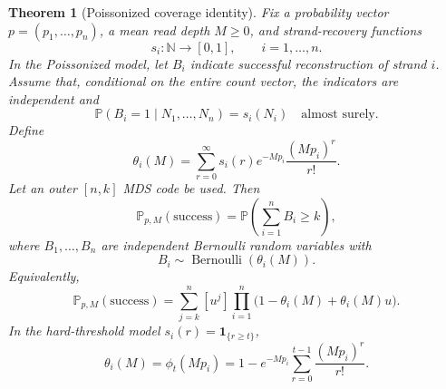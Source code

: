 \documentclass[11pt]{article}
\newtheorem{theorem}{Theorem}
\theoremstyle{definition}
\theoremstyle{remark}
\DeclareMathOperator{\Bernoulli}{Bernoulli}
\newcommand{\Pbb}{\mathbb P}
\newcommand{\N}{\mathbb N}
\newcommand{\1}{\mathbf 1}
\begin{document}
\begin{theorem}[Poissonized coverage identity]\label{thm:poissonized-identity}
Fix a probability vector \(p=(p_1,\ldots,p_n)\), a mean read depth \(M\ge0\), and strand-recovery functions
\[
  s_i:\N\to[0,1],\qquad i=1,\ldots,n.
\]
In the Poissonized model, let \(B_i\) indicate successful reconstruction of strand \(i\). Assume that, conditional on the entire count vector, the indicators are independent and
\[
 \Pbb(B_i=1\mid N_1,\ldots,N_n)=s_i(N_i)
 \quad\text{almost surely}.
\]
Define
\[
  \theta_i(M)
  =\sum_{r=0}^{\infty}s_i(r)e^{-Mp_i}\frac{(Mp_i)^r}{r!}.
\]
Let an outer \([n,k]\) MDS code be used.  Then
\[
  \Pbb_{p,M}(\mathrm{success})
  =\Pbb\left(\sum_{i=1}^n B_i\ge k\right),
\]
where \(B_1,\ldots,B_n\) are independent Bernoulli random variables with
\[
  B_i\sim \Bernoulli(\theta_i(M)).
\]
Equivalently,
\[
  \Pbb_{p,M}(\mathrm{success})
  =\sum_{j=k}^{n}[u^j]\prod_{i=1}^n
  \bigl(1-\theta_i(M)+\theta_i(M)u\bigr).
\]
In the hard-threshold model \(s_i(r)=\1_{\{r\ge t\}}\),
\[
  \theta_i(M)=\phi_t(Mp_i)
  =1-e^{-Mp_i}\sum_{r=0}^{t-1}\frac{(Mp_i)^r}{r!}.
\]
\end{theorem}
\end{document}
